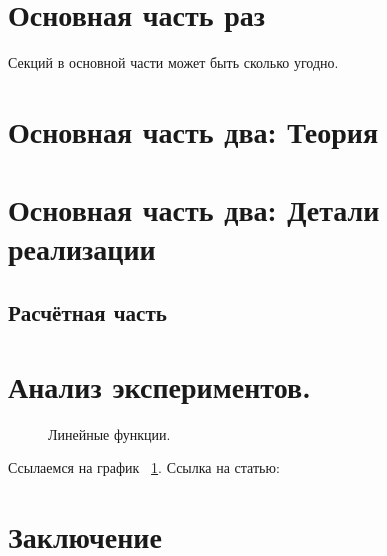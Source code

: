 \documentclass[aps,%
12pt,%
final,%
oneside,
onecolumn,%
musixtex, %
superscriptaddress,%
centertags]{article} %
\begin{document}
\section{Основная часть раз}
Секций в основной части может быть сколько угодно.

\section{Основная часть два: Теория}

\section{Основная часть два: Детали реализации}
\subsection{Расчётная часть}

\section{Анализ экспериментов.}
\begin{figure}[ht]
\begin{center}


\caption{
\label{graph-fig}
     Линейные функции.}
\end {center}
\end {figure}
Ссылаемся на график ~\ref{graph-fig}.
Ссылка на статью: \cite{DBLP:conf/adbis/NovikovP03}
\section{Заключение}





\end{document}

